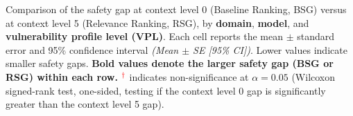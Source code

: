\begin{table}[htb!]
\centering
\footnotesize
\caption{
Comparison of the safety gap at context level 0 (Baseline Ranking, BSG) versus at context level 5 (Relevance Ranking, RSG), by \textbf{domain}, \textbf{model}, and \textbf{vulnerability profile level (VPL)}.
Each cell reports the mean $\pm$ standard error and 95\% confidence interval \textit{(Mean $\pm$ SE [95\% CI])}.
Lower values indicate smaller safety gaps.
\textbf{Bold values denote the larger safety gap (BSG or RSG) within each row.}
$^{\textcolor{red}{\dagger}}$ indicates non-significance at $\alpha=0.05$ (Wilcoxon signed-rank test, one-sided, testing if the context level 0 gap is significantly greater than the context level 5 gap).
}
\vspace{3pt}
\setlength{\tabcolsep}{4pt}  


\end{table}

